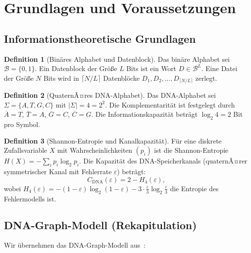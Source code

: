 ﻿\documentclass[a4paper,12pt]{article}
\theoremstyle{definition}
\newtheorem{definition}{Definition}
\begin{document}
\section{Grundlagen und Voraussetzungen}
\label{sec:grundlagen}

\subsection{Informationstheoretische Grundlagen}

\begin{definition}[Bin\"{a}res Alphabet und Datenblock]
    Das bin\"{a}re Alphabet sei $\mathcal{B} = \{0, 1\}$.
    Ein Datenblock der Gr\"{o}\ss{}e $L$ Bits ist ein Wort
    $D \in \mathcal{B}^L$.
    Eine Datei der Gr\"{o}\ss{}e $N$ Bits wird in $\lceil N/L \rceil$
    Datenbl\"{o}cke $D_1, D_2, \ldots, D_{\lceil N/L \rceil}$ zerlegt.
\end{definition}

\begin{definition}[QuaternÃ¤res DNA-Alphabet]
    Das DNA-Alphabet sei $\Sigma = \{A, T, G, C\}$ mit
    $|\Sigma| = 4 = 2^2$. Die Komplementarit\"{a}t ist festgelegt durch
    $\overline{A}=T$, $\overline{T}=A$, $\overline{G}=C$, $\overline{C}=G$.
    Die Informationskapazit\"{a}t betr\"{a}gt $\log_2 4 = 2$ Bit pro Symbol.
\end{definition}

\begin{definition}[Shannon-Entropie und Kanalkapazit\"{a}t]
    F\"{u}r eine diskrete Zufallsvariable $X$ mit Wahrscheinlichkeiten
    $(p_i)$ ist die Shannon-Entropie
    $H(X) = -\sum_i p_i \log_2 p_i$.
    Die Kapazit\"{a}t des DNA-Speicherkanals (quaternÃ¤rer symmetrischer
    Kanal mit Fehlerrate $\varepsilon$) betr\"{a}gt:
    \[
        C_{\text{DNA}}(\varepsilon) = 2 - H_4(\varepsilon),
    \]
    wobei $H_4(\varepsilon) = -(1-\varepsilon)\log_2(1-\varepsilon)
    - 3 \cdot \frac{\varepsilon}{3}\log_2\frac{\varepsilon}{3}$
    die Entropie des Fehlermodells ist.
\end{definition}

\subsection{DNA-Graph-Modell (Rekapitulation)}

Wir \"{u}bernehmen das DNA-Graph-Modell aus~\cite{epp_dna2026}:
\end{document}
